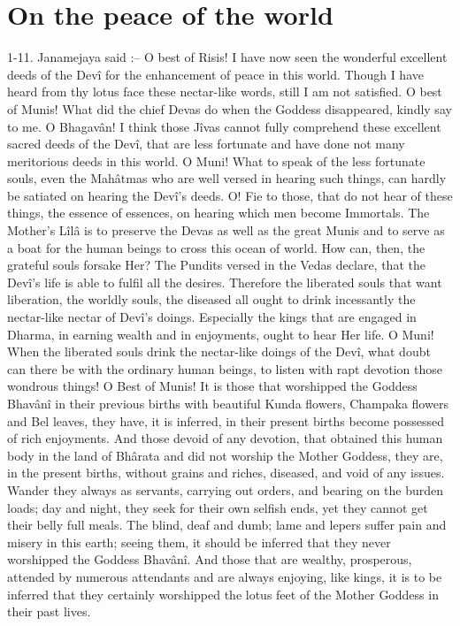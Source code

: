 ﻿\chapter{On the peace of the world}

1-11. Janamejaya said :-- O best of Risis! I have now seen the wonderful excellent deeds of the Dev\^i for the enhancement of peace in this world. Though I have heard from thy lotus face these nectar-like words, still I am not satisfied. O best of Munis! What did the chief Devas do when the Goddess disappeared, kindly say to me. O Bhagav\^an! I think those J\^ivas cannot fully comprehend these excellent sacred deeds of the Dev\^i, that are less fortunate and have done not many meritorious deeds in this world. O Muni! What to speak of the less fortunate souls, even the Mah\^atmas who are well versed in hearing such things, can hardly be satiated on hearing the Dev\^i's deeds. O! Fie to those, that do not hear of these things, the essence of essences, on hearing which men become Immortals. The Mother's L\^il\^a is to preserve the Devas as well as the great Munis and to serve as a boat for the human beings to cross this ocean of world. How can, then, the grateful souls forsake Her? The Pundits versed in the Vedas declare, that the Dev\^i's life is able to fulfil all the desires. Therefore the liberated souls that want liberation, the worldly souls, the diseased all ought to drink incessantly the nectar-like nectar of Dev\^i's doings. Especially the kings that are engaged in Dharma, in earning wealth and in enjoyments, ought to hear Her life. O Muni! When the liberated souls drink the nectar-like doings of the Dev\^i, what doubt can there be with the ordinary human beings, to listen with rapt devotion those wondrous things! O Best of Munis! It is those that worshipped the Goddess Bhav\^an\^i in their previous births with beautiful Kunda flowers, Champaka flowers and Bel leaves, they have, it is inferred, in their present births become possessed of rich enjoyments. And those devoid of any devotion, that obtained this human body in the land of Bh\^arata and did not worship the Mother Goddess, they are, in the present births, without grains and riches, diseased, and void of any issues. Wander they always as servants, carrying out orders, and bearing on the burden loads; day and night, they seek for their own selfish ends, yet they cannot get their belly full meals. The blind, deaf and dumb; lame and lepers suffer pain and misery in this earth; seeing them, it should be inferred that they never worshipped the Goddess Bhav\^an\^i. And those that are wealthy, prosperous, attended by numerous attendants and are always enjoying, like kings, it is to be inferred that they certainly worshipped the lotus feet of the Mother Goddess in their past lives.

